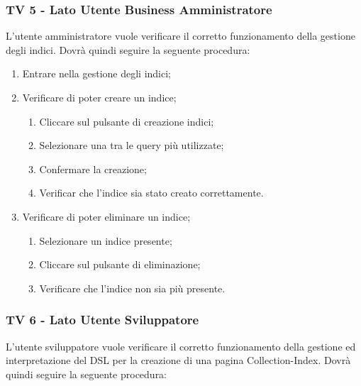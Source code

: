 \subsubsection{TV 5 - Lato Utente Business Amministratore}

L’utente amministratore vuole verificare il corretto funzionamento della gestione degli indici.
Dovrà quindi seguire la seguente procedura:

\begin{enumerate}
\item Entrare nella gestione degli indici;
\item Verificare di poter creare un indice;
\begin{enumerate}
\item Cliccare sul pulsante di creazione indici;
\item Selezionare una tra le query più utilizzate;
\item Confermare la creazione;
\item Verificar che l'indice sia stato creato correttamente.
\end{enumerate}
\item Verificare di poter eliminare un indice;
\begin{enumerate}
\item Selezionare un indice presente;
\item Cliccare sul pulsante di eliminazione;
\item Verificare che l'indice non sia più presente.
\end{enumerate}
\end{enumerate}

\subsubsection{TV 6 - Lato Utente Sviluppatore}

L’utente sviluppatore vuole verificare il corretto funzionamento della gestione ed interpretazione del DSL per la creazione di una pagina Collection-Index.
Dovrà quindi seguire la seguente procedura:

